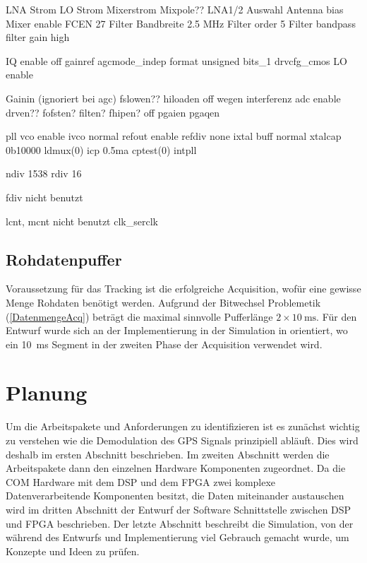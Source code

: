 %

LNA Strom
LO Strom
Mixerstrom
Mixpole??
LNA1/2 Auswahl
Antenna bias
Mixer enable
FCEN 27
Filter Bandbreite 2.5 MHz
Filter order 5
Filter bandpass
filter gain high

IQ enable off
gainref 
agcmode_indep
format unsigned
bits_1
drvcfg_cmos
LO enable

Gainin (ignoriert bei agc)
fslowen??
hiloaden off wegen interferenz
adc enable
drven??
fofsten?
filten?
fhipen? off
pgaien
pgaqen

pll vco enable
ivco normal
refout enable
refdiv none
ixtal buff normal
xtalcap 0b10000
ldmux(0)
icp 0.5ma
cptest(0)
intpll

ndiv 1538
rdiv 16

fdiv nicht benutzt

lcnt, mcnt nicht benutzt
clk_serclk

\subsection{Rohdatenpuffer}
Voraussetzung für das Tracking ist die erfolgreiche Acquisition, wofür eine gewisse Menge Rohdaten benötigt werden. Aufgrund der Bitwechsel Problemetik (\ref{DatenmengeAcq}) beträgt die maximal sinnvolle Pufferlänge $2\times\SI{10}{\ms}$. Für den Entwurf wurde sich an der Implementierung in der Simulation in \cite{borre2007software} orientiert, wo ein \SI{10}{\ms} Segment in der zweiten Phase der Acquisition verwendet wird.




 


\section{Planung}
Um die Arbeitspakete und Anforderungen zu identifizieren ist es zunächst wichtig zu verstehen wie die Demodulation des GPS Signals prinzipiell abläuft. Dies wird deshalb im ersten Abschnitt beschrieben. Im zweiten Abschnitt werden die Arbeitspakete dann den einzelnen Hardware Komponenten zugeordnet. Da die COM Hardware mit dem DSP und dem FPGA zwei komplexe Datenverarbeitende Komponenten besitzt, die Daten miteinander austauschen wird im dritten Abschnitt der Entwurf der Software Schnittstelle zwischen DSP und FPGA beschrieben. Der letzte Abschnitt beschreibt die Simulation, von der während des Entwurfs und Implementierung viel Gebrauch gemacht wurde, um Konzepte und Ideen zu prüfen.

